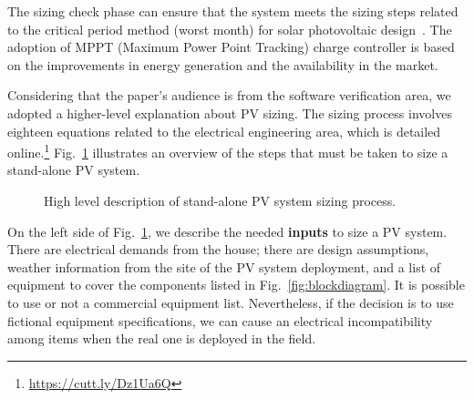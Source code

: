 \documentclass[journal]{IEEEtran}
\begin{document}
The sizing check phase can ensure that the system meets the sizing steps related to the critical period method (worst month) for solar photovoltaic design~\cite{Pinho}. The adoption of MPPT (Maximum Power Point Tracking) charge controller is based on the improvements in energy generation and the availability in the market. 
 

Considering that the paper's audience is from the software verification area, we adopted a higher-level explanation about PV sizing. The sizing process involves eighteen equations related to the electrical engineering area, which is detailed online.\footnote{\href{https://cutt.ly/Dz1Ua6Q}{https://cutt.ly/Dz1Ua6Q}} 
Fig.~\ref{fig:flow} illustrates an overview of the steps that must be taken to size a stand-alone PV system.
%
\begin{figure}[ht]
\centering
\caption{High level description of stand-alone PV system sizing process.}
\label{fig:flow} 
\end{figure}
 

On the left side of Fig.~\ref{fig:flow}, we describe the needed \textbf{inputs} to size a PV system. There are electrical demands from the house; there are design assumptions, weather information from the site of the PV system deployment, and a list of equipment to cover the components listed in Fig.~\ref{fig:blockdiagram}. It is possible to use or not a commercial equipment list. Nevertheless, if the decision is to use fictional equipment specifications, we can cause an electrical incompatibility among items when the real one is deployed in the field.
 
\end{document}
